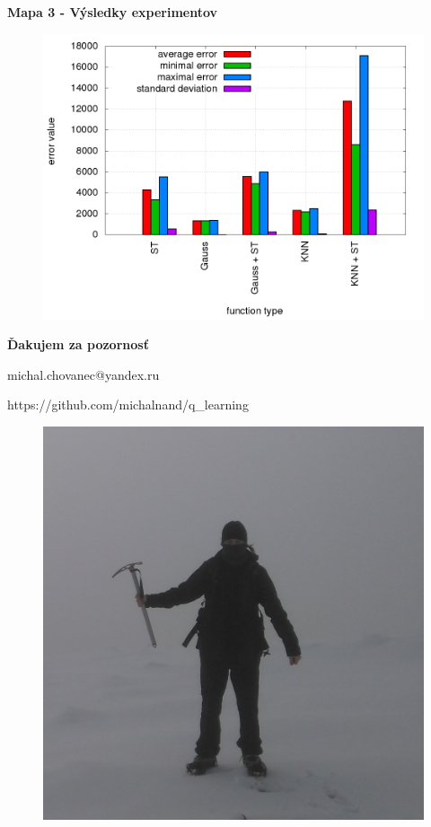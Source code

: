 \documentclass[xcolor=dvipsnames]{beamer}
\begin{document}
\begin{frame}{\bf Mapa 3 - Výsledky experimentov}

\begin{figure}[!htb]
\centering
\includegraphics[scale=.36]{../../results_q_learning/map_3/trials_average_results.png}
\end{figure}

\end{frame}

\begin{frame}{\bf Ďakujem za pozornosť}

\centerline{michal.chovanec@yandex.ru}
\centerline{https://github.com/michalnand/q\_learning}

\begin{figure}[!htb]
\centering
\includegraphics[scale=.15]{../pictures/me.jpg}
\end{figure}



\end{frame}
\end{document}
